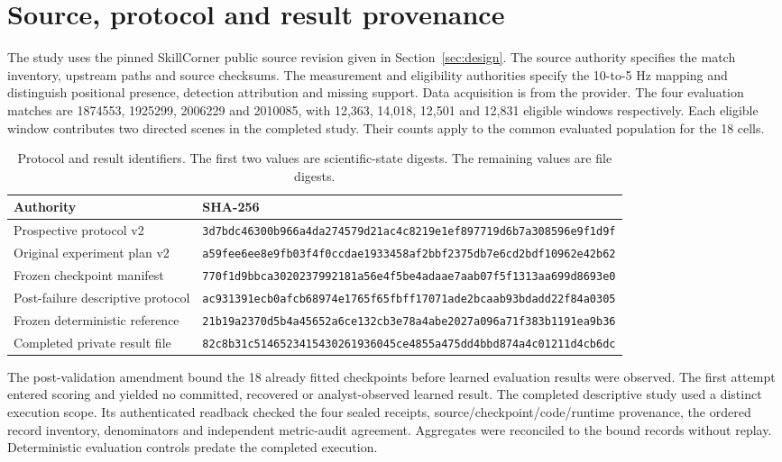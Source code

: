 \section{Source, protocol and result provenance}
\label{app:provenance}

The study uses the pinned SkillCorner public source revision given in Section~\ref{sec:design}. The source authority specifies the match inventory, upstream paths and source checksums. The measurement and eligibility authorities specify the 10-to-5 Hz mapping and distinguish positional presence, detection attribution and missing support. Data acquisition is from the provider. The four evaluation matches are 1874553, 1925299, 2006229 and 2010085, with 12,363, 14,018, 12,501 and 12,831 eligible windows respectively. Each eligible window contributes two directed scenes in the completed study. Their counts apply to the common evaluated population for the 18 cells.

\begin{table}[h]
\centering
\caption{Protocol and result identifiers. The first two values are scientific-state digests. The remaining values are file digests.}
\label{tab:digests}
\begin{tabular}{@{}ll@{}}
\toprule
Authority & SHA-256 \\
\midrule
Prospective protocol v2 & \texttt{\scriptsize 3d7bdc46300b966a4da274579d21ac4c8219e1ef897719d6b7a308596e9f1d9f} \\
Original experiment plan v2 & \texttt{\scriptsize a59fee6ee8e9fb03f4f0ccdae1933458af2bbf2375db7e6cd2bdf10962e42b62} \\
Frozen checkpoint manifest & \texttt{\scriptsize 770f1d9bbca3020237992181a56e4f5be4adaae7aab07f5f1313aa699d8693e0} \\
Post-failure descriptive protocol & \texttt{\scriptsize ac931391ecb0afcb68974e1765f65fbff17071ade2bcaab93bdadd22f84a0305} \\
Frozen deterministic reference & \texttt{\scriptsize 21b19a2370d5b4a45652a6ce132cb3e78a4abe2027a096a71f383b1191ea9b36} \\
Completed private result file & \texttt{\scriptsize 82c8b31c5146523415430261936045ce4855a475dd4bbd874a4c01211d4cb6dc} \\
\bottomrule
\end{tabular}
\end{table}

The post-validation amendment bound the 18 already fitted checkpoints before learned evaluation results were observed. The first attempt entered scoring and yielded no committed, recovered or analyst-observed learned result. The completed descriptive study used a distinct execution scope. Its authenticated readback checked the four sealed receipts, source/checkpoint/code/runtime provenance, the ordered record inventory, denominators and independent metric-audit agreement. Aggregates were reconciled to the bound records without replay. Deterministic evaluation controls predate the completed execution.

